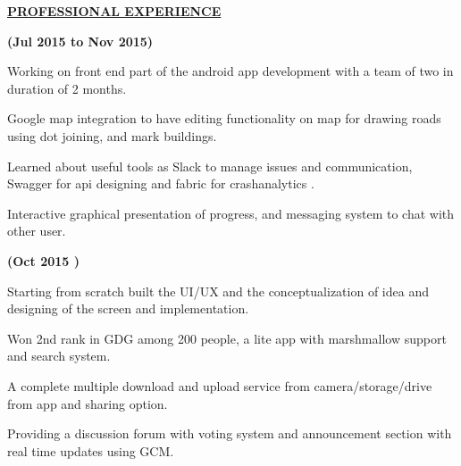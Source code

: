 \documentclass[letterpaper]{deedy-resume} %
\begin{document}

{\uppercase\uline{\textbf{\large{Professional Experience}}\hfill}}
\microspace


\sectionspace %
\hfill {\textbf{(Jul 2015 to Nov 2015)}}\\

\begin{tightitemize}
\item Working on front end part of the android app development with a team of two in duration of 2 months.
\item Google map integration to have editing functionality on map for drawing roads using dot joining, and mark buildings. 
\item Learned about useful tools as Slack to manage issues and communication, Swagger for api designing and fabric for crashanalytics .
\item Interactive graphical presentation of progress, and messaging system to chat with other user.  
\end{tightitemize}




\sectionspace %
\hfill {\textbf{(Oct 2015 )}}\\

\begin{tightitemize}
\item Starting from scratch built the UI/UX and the conceptualization of idea and designing of the screen and implementation.
\item Won 2nd rank in GDG among 200 people, a lite app with marshmallow support and search system.
\item A complete multiple download and upload service from camera/storage/drive from app and sharing option.
\item Providing a discussion forum with voting system and announcement section with real time updates using GCM.
\end{tightitemize}
\end{document}

